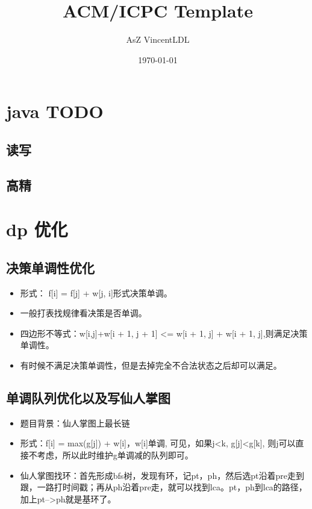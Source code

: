 \documentclass[landscape]{report}
\newcommand{\includecode}[2][c]{}
\begin{document}
 
\begin{flushleft}

\dominitoc[n]
\title{ACM/ICPC Template}
\author{AsZ VincentLDL}
\date{\today}
\maketitle
\setcounter{secnumdepth}{3}
\tableofcontents
\newpage
\begin{multicols}{2}
\chapter{ java TODO}
\section{ 读写}
\section{ 高精}

\chapter{ dp 优化}
\section{ 决策单调性优化}
\begin{itemize}
\item 形式： f[i] = f[j] + w[j, i]形式决策单调。
\item 一般打表找规律看决策是否单调。
\item 四边形不等式：w[i,j]+w[i + 1, j + 1] <= w[i + 1, j] + w[i + 1, j],则满足决策单调性。
\item 有时候不满足决策单调性，但是去掉完全不合法状态之后却可以满足。
\end{itemize}
 \includecode[c++]{hnoi2008toys.cpp}   

\section{ 单调队列优化以及写仙人掌图}
\begin{itemize}
\item 题目背景：仙人掌图上最长链
\item 形式：f[i] = max(g[j]) + w[i]，w[i]单调, 可见，如果j<k, g[j]<g[k], 则j可以直接不考虑，所以此时维护g单调减的队列即可。
\item 仙人掌图找环：首先形成bfs树，发现有环，记pt，ph，然后选pt沿着pre走到跟，一路打时间戳；再从ph沿着pre走，就可以找到lca。pt，ph到lca的路径，加上pt-->ph就是基环了。
\end{itemize}
\includecode[c++]{ioi2008Island.cpp}

\end{multicols}
\end{flushleft}
\end{document}
